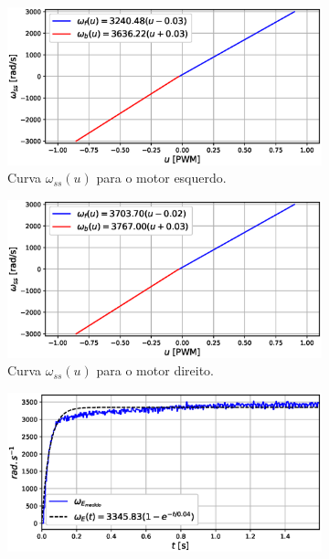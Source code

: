 \begin{figure}[H]
    \begin{subfigure}{.5\textwidth}
    \centering
    \includegraphics[width=\textwidth]{figuras/resultados/exp04/curva_feedforward_esquerdo100.eps}
    \caption{Curva $\omega_{ss}(u)$ para o motor esquerdo.}
    \label{fig:exp04:curva_feedforward_esquerdo}
    \end{subfigure}
    \hfill
    \begin{subfigure}{.5\textwidth}
    \centering
    \includegraphics[width=\textwidth]{figuras/resultados/exp04/curva_feedforward_direito100.eps}
    \caption{Curva $\omega_{ss}(u)$ para o motor direito.}
    \label{fig:exp04:curva_feedforward_direito}
    \end{subfigure}
    \begin{subfigure}{.5\textwidth}
    \centering
    \includegraphics[width=\textwidth]{figuras/resultados/exp04/regressao_vs_medido_esquerdo100.eps}

\end{subfigure}
\end{figure}

